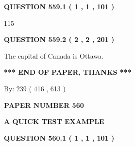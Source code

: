 \documentclass[12pt]{article}
\begin{document}
{\textbf{\Large{QUESTION
559.1 
 ( 1 , 1 , 101 )
}}}
  
  
 
 
\noindent{}

115
 
 
  
\vspace{0.2in}
  
{\textbf{\Large{QUESTION
559.2 
 ( 2 , 2 , 201 )
}}}
  
  
 
 
\noindent{}
 
 
The capital of Canada is Ottawa.
 
 
 
 
   
   
 \vspace{0.2in}
 
   
   
   
   
\vspace{1.0in} 
{\textbf{\large{ *** END OF PAPER, THANKS *** }}} 
   
   
\hspace{1.0in} By: 
 239 ( 416 ,  613 )
   
   
   
   
\newpage 
\setcounter{page}{ 
   560001 } 
   
   
   
   
 {\textbf{ \Large{ PAPER NUMBER  560  }}}
   
   
\vspace{0.2in}
   
   
   
   
   
   
 \vspace{0.2in}
{\LARGE {\textbf{ A QUICK TEST EXAMPLE}}}
   
   
  
\vspace{0.2in}
  
{\textbf{\Large{QUESTION
560.1 
 ( 1 , 1 , 101 )
}}}
  
  
 
 
\noindent{}
\end{document}
